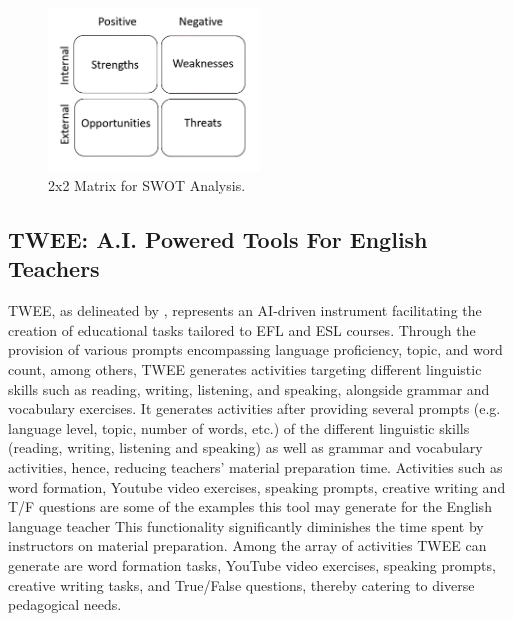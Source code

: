 \begin{figure}[!htbp]
    \centering
    \caption{2x2 Matrix for SWOT Analysis.}
    \label{img-01}
    \includegraphics[width=0.5\textwidth]{image1.png}
\end{figure}

\subsection{TWEE: A.I. Powered Tools For English Teachers}\label{sub-sec-twee}

TWEE, as delineated by \textcite{ravshanovna2023}, represents an AI-driven
instrument facilitating the creation of educational tasks tailored to
EFL and ESL courses. Through the provision of various prompts
encompassing language proficiency, topic, and word count, among others,
TWEE generates activities targeting different linguistic skills such as
reading, writing, listening, and speaking, alongside grammar and
vocabulary exercises. It generates activities after providing several
prompts (e.g. language level, topic, number of words, etc.) of the
different linguistic skills (reading, writing, listening and speaking)
as well as grammar and vocabulary activities, hence, reducing teachers'
material preparation time. Activities such as word formation, Youtube
video exercises, speaking prompts, creative writing and T/F questions
are some of the examples this tool may generate for the English language
teacher This functionality significantly diminishes the time spent by
instructors on material preparation. Among the array of activities TWEE
can generate are word formation tasks, YouTube video exercises, speaking
prompts, creative writing tasks, and True/False questions, thereby
catering to diverse pedagogical needs.

